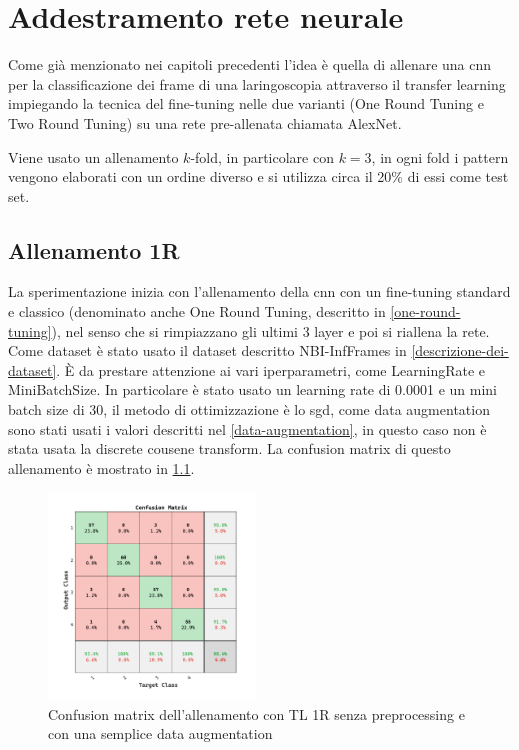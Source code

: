 \chapter{Addestramento rete neurale}\label{addestramento-rete-neurale}


Come già menzionato nei capitoli precedenti l’idea è quella di allenare una \gls{cnn} per la classificazione dei frame di una laringoscopia attraverso il transfer learning impiegando la tecnica del
fine-tuning nelle due varianti (One Round Tuning e Two Round Tuning)  su una rete pre-allenata chiamata AlexNet.


Viene usato un allenamento \(k\)-fold, in particolare con \(k=3\), in ogni fold i  pattern vengono elaborati con un
ordine diverso e si utilizza circa il 20\% di essi come test set.


\section{Allenamento 1R}\label{allenamento-1r}

La sperimentazione inizia con l'allenamento della \gls{cnn} con un fine-tuning standard e classico (denominato anche One Round Tuning, descritto in \cref{one-round-tuning}), nel senso che si rimpiazzano gli ultimi 3 layer e poi si riallena la rete. Come dataset è stato usato il dataset descritto NBI-InfFrames in \cref{descrizione-dei-dataset}. È da prestare attenzione ai vari iperparametri, come \Gls{LearningRate} e \Gls{MiniBatchSize}. In particolare è stato usato un learning rate di 0.0001 e un mini batch size di 30, il metodo di ottimizzazione è lo \gls{sgd}, come data augmentation sono stati usati i valori descritti nel \cref{data-augmentation}, in questo caso non è stata usata la discrete cousene transform. La confusion matrix di questo allenamento è mostrato in \cref{fig:result-one-liscio}.


\begin{figure}[H]
    \centering
    \includegraphics[width=0.49\textwidth]{addestramento-rete-neurale/one-liscio.pdf}
    \caption{Confusion matrix dell'allenamento con TL 1R senza preprocessing e con una semplice data augmentation}
    \label{fig:result-one-liscio}
\end{figure}

